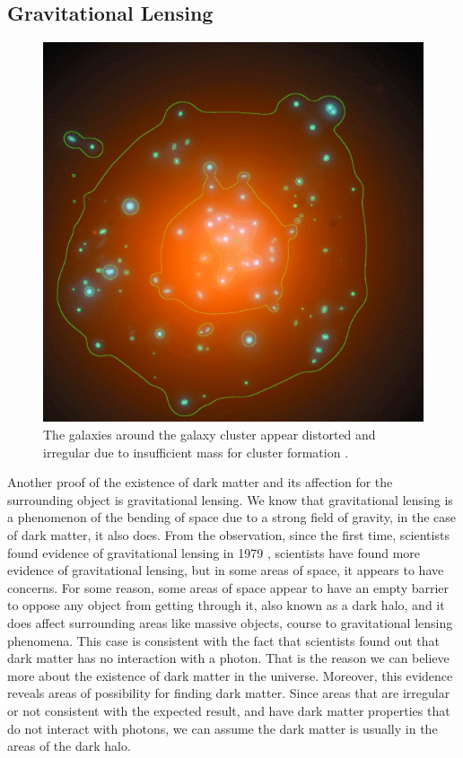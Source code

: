 \documentclass[10pt, oneside]{book}
\numberwithin{equation}{chapter}
\begin{document}
\subsection{Gravitational Lensing}
\begin{figure}[h]
    \centering
    \includegraphics[width=0.5\linewidth]{images/Gravitational lensing.png}
    \caption{The galaxies around the galaxy cluster appear distorted and irregular due to insufficient mass for cluster formation \cite{Tyson_1998}.}
    \label{gravittional lensing}
\end{figure}
Another proof of the existence of dark matter and its affection for the surrounding object is gravitational lensing. We know that gravitational lensing is a phenomenon of the bending of space due to a strong field of gravity, in the case of dark matter, it also does. From the observation, since the first time, scientists found evidence of gravitational lensing in 1979 \cite{Walsh1979}, scientists have found more evidence of gravitational lensing, but in some areas of space, it appears to have concerns. For some reason, some areas of space appear to have an empty barrier to oppose any object from getting through it, also known as a dark halo, and it does affect surrounding areas like massive objects, course to gravitational lensing phenomena. This case is consistent with the fact that scientists found out that dark matter has no interaction with a photon. That is the reason we can believe more about the existence of dark matter in the universe. Moreover, this evidence reveals areas of possibility for finding dark matter. Since areas that are irregular or not consistent with the expected result, and have dark matter properties that do not interact with photons, we can assume the dark matter is usually in the areas of the dark halo.
\end{document}
